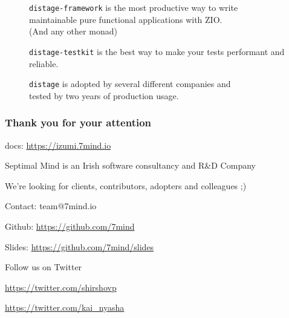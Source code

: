 \documentclass[usenames,dvipsnames,aspectratio=169]{beamer}
\newcommand{\distage}{\texttt{distage}\xspace}
\begin{document}
\begin{frame}
  \begin{figure}
    \texttt{distage-framework} is the most productive way to write \\
    maintainable pure functional applications with ZIO. \\
    (And any other monad)
  \end{figure}
  \begin{figure}
    \texttt{distage-testkit} is the best way to make your tests performant and reliable.
  \end{figure}
  \begin{figure}
    \distage is adopted by several different companies and \\
    tested by two years of production usage.
  \end{figure}
\end{frame}


\begin{frame}
    \frametitle{Thank you for your attention}
    \begin{center}
      docs: \url{https://izumi.7mind.io}
    \end{center}
    \begin{center}
      \color{RubineRed}
      Septimal Mind is an Irish software consultancy and R\&D Company

      \vspace{0.3cm}
      We're looking for clients, contributors, adopters and colleagues ;)
    \end{center}
    \begin{center}
      Contact: team@7mind.io

      \vspace{0.3cm}
      Github: \url{https://github.com/7mind}

      \vspace{0.3cm}
      Slides: \url{https://github.com/7mind/slides}
    \end{center}
    \begin{center}
      \color{RoyalBlue}
      Follow us on Twitter

      \vspace{0.3cm}
      \url{https://twitter.com/shirshovp}

      \vspace{0.3cm}
      \url{https://twitter.com/kai_nyasha}
    \end{center}
\end{frame}
\end{document}
